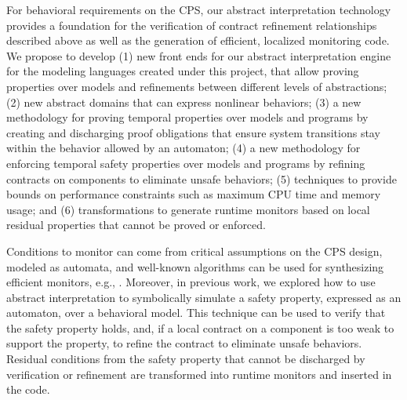 For  behavioral requirements on the CPS, our abstract interpretation technology provides a foundation for the verification of contract refinement relationships described above as well as the generation of efficient, localized monitoring code.
We propose to develop (1) new front ends for our abstract
interpretation engine for the modeling languages created under this
project, that allow proving properties over models and refinements
between different levels of abstractions; (2) new abstract domains
that can express nonlinear behaviors;
(3) a new methodology for proving temporal properties over models and
programs by creating and discharging proof obligations that ensure
system transitions stay within the behavior allowed by an automaton;
(4) a new methodology for enforcing temporal safety properties over
models and programs by refining contracts on components to eliminate
unsafe behaviors;
(5) techniques to provide bounds on performance constraints such as
maximum CPU time and memory usage; and (6) transformations to generate
runtime monitors based on local residual properties that cannot be
proved or enforced.

Conditions to monitor can come from critical assumptions on the CPS design, modeled as automata, and well-known algorithms can be used for synthesizing efficient monitors, e.g., \cite{Havelund04,Rosu08}.
Moreover, in previous work, we explored how to use abstract interpretation to
symbolically simulate a safety property, expressed as an automaton,
over a behavioral model.  This technique can be used to verify that
the safety property holds, and, if a local contract on a component is
too weak to support the property, to refine the contract to eliminate
unsafe behaviors.  Residual conditions from the safety property that
cannot be discharged by verification or refinement are transformed
into runtime monitors and inserted in the code.


